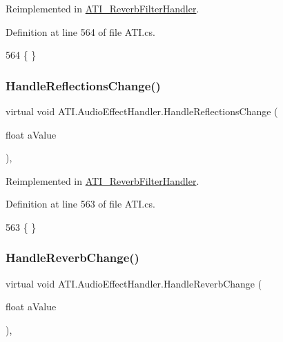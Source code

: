 Reimplemented in \hyperlink{class_a_t_i___reverb_filter_handler_a83de9c38851424d66456dfe98163dfde}{A\+T\+I\+\_\+\+Reverb\+Filter\+Handler}.



Definition at line 564 of file A\+T\+I.\+cs.


\begin{DoxyCode}
564 \{ \}
\end{DoxyCode}
\mbox{\label{class_a_t_i_1_1_audio_effect_handler_af50ba52dba236a3b711172fd6bbc1bab}} 
\subsubsection{\texorpdfstring{Handle\+Reflections\+Change()}{HandleReflectionsChange()}}
{\footnotesize\ttfamily virtual void A\+T\+I.\+Audio\+Effect\+Handler.\+Handle\+Reflections\+Change (\begin{DoxyParamCaption}\item[{float}]{a\+Value }\end{DoxyParamCaption})\hspace{0.3cm}{\ttfamily [protected]}, {\ttfamily [virtual]}}



Reimplemented in \hyperlink{class_a_t_i___reverb_filter_handler_a8db38f7eafd2b1ed0a5f8d488244d83a}{A\+T\+I\+\_\+\+Reverb\+Filter\+Handler}.



Definition at line 563 of file A\+T\+I.\+cs.


\begin{DoxyCode}
563 \{ \}
\end{DoxyCode}
\mbox{\label{class_a_t_i_1_1_audio_effect_handler_aee7aa84aa7d433a7f7264aff131d5a6a}} 
\subsubsection{\texorpdfstring{Handle\+Reverb\+Change()}{HandleReverbChange()}}
{\footnotesize\ttfamily virtual void A\+T\+I.\+Audio\+Effect\+Handler.\+Handle\+Reverb\+Change (\begin{DoxyParamCaption}\item[{float}]{a\+Value }\end{DoxyParamCaption})\hspace{0.3cm}{\ttfamily [protected]}, {\ttfamily [virtual]}}



